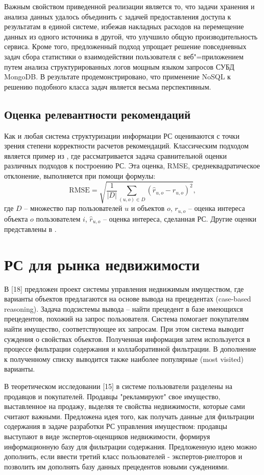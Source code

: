 \documentclass[a4paper,14pt,openany,final]{extreport} %
\begin{document}
    Важным свойством приведенной реализации является то, что задачи хранения и анализа данных удалось объединить с задачей предоставления доступа к результатам в единой системе, избежав накладных расходов на перемещение данных из одного источника в другой, что улучшило общую производительность сервиса. Кроме того, предложенный подход упрощает решение повседневных задач сбора статистики о взаимодействии пользователя с веб"=приложением путем анализа структурированных логов мощным языком запросов СУБД MongoDB.  В результате продемонстрировано, что применение NoSQL к решению подобного класса задач является весьма перспективным.

\subsection{Оценка релевантности рекомендаций}
\label{sec:rs-eval}

Как и любая система структуризации информации РС оцениваются с точки зрения степени корректности расчетов рекомендаций. Классическим подходом является пример из \cite{b13}, где рассматривается задача сравнительной оценки различных подходов к построению РС.  Эта оценка, RMSE, среднеквадратическое отклонение, выполняется при помощи формулы:
    \[
      \mbox{RMSE}=\sqrt{\frac{1}{|D|}\sum_{(u,o)\in D}(\hat{r}_{u,o}-r_{u,o})^2},
    \]
где $D$ -- множество пар пользователей $u$ и объектов $o$, $r_{u,o}$ -- оценка интереса объекта $o$ пользователем $i$, \(\hat{r}_{u,o}\) -- оценка интереса, сделанная РС. Другие оценки представлены в \cite{b10}. %




\section{РС для рынка недвижимости}
\label{sec:ex-retail}


В [18] предложен проект системы управления недвижимым имуществом, где варианты объектов предлагаются на основе вывода на прецедентах (case-based reasoning). Задача подсистемы вывода – найти  прецедент в базе имеющихся прецедентов, похожий на запрос пользователя. Система помогает покупателям найти имущество, соответствующее их запросам. При этом система выводит суждения о свойствах объектов. Полученная информация затем используется в процессе фильтрации содержания и коллаборативной фильтрации. В дополнение к полученному списку выводится также наиболее популярные (most visited) варианты.

В теоретическом исследовании [15] в системе пользователи разделены на продавцов и покупателей. Продавцы "рекламируют" свое имущество, выставленное на продажу, выделяя те свойства недвижимости, которые сами считают важными. Предложена идея того, как получать данные для фильтрации содержания в задаче разработки РС управления имуществом: продавцы выступают в виде экспертов-оценщиков недвижимости, формируя информационную базу для фильтрации содержания. Предложенную идею можно дополнить, если ввести третий класс пользователей - экспертов-риелторов и позволить им дополнять базу данных прецедентов новыми суждениями.
\end{document}
